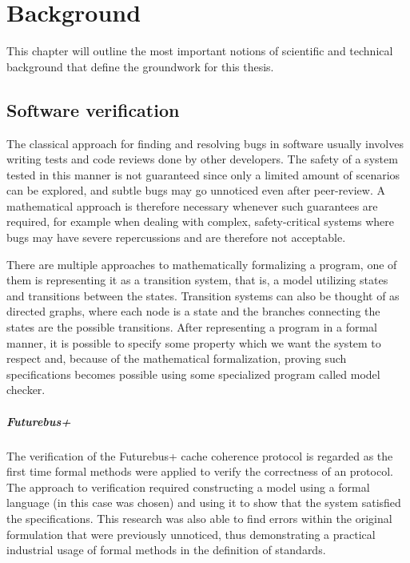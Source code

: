 \chapter{Background}
This chapter will outline the most important notions of scientific and technical background that define the groundwork for this thesis.

\section{Software verification}
The classical approach for finding and resolving bugs in software usually involves writing tests and code reviews done by other developers.
The safety of a system tested in this manner is not guaranteed since only a limited amount of scenarios can be explored, and subtle bugs may go unnoticed even after peer-review.
A mathematical approach is therefore necessary whenever such guarantees are required, for example when dealing with complex, safety-critical systems where bugs may have severe repercussions and are therefore not acceptable.

There are multiple approaches to mathematically formalizing a program, one of them is representing it as a transition system, that is, a model utilizing states and transitions between the states.
Transition systems can also be thought of as directed graphs, where each node is a state and the branches connecting the states are the possible transitions.
After representing a program in a formal manner, it is possible to specify some property which we want the system to respect and, because of the mathematical formalization, proving such specifications becomes possible using some specialized program called model checker.

\paragraph*{Futurebus+}
The verification of the \ieee{} Futurebus+ cache coherence protocol \cite{futurebus-plus} is regarded as the first time formal methods were applied to verify the correctness of an \ieee{} protocol.
The approach to verification required constructing a model using a formal language (in this case \smv{} was chosen) and using it to show that the system satisfied the specifications.
This research was also able to find errors within the original formulation that were previously unnoticed, thus demonstrating a practical industrial usage of formal methods in the definition of standards.

